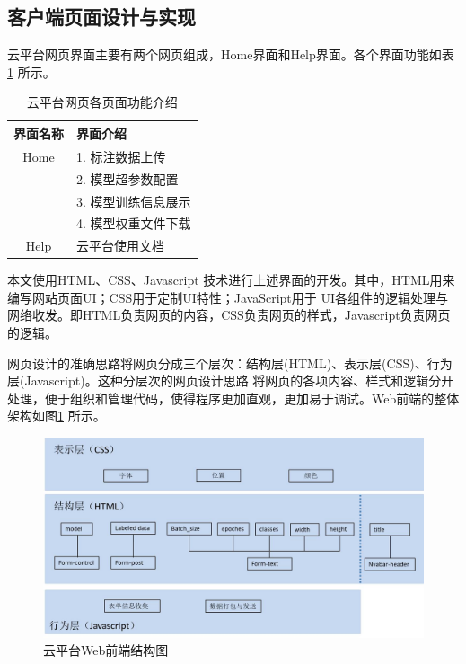 \subsection{客户端页面设计与实现}

云平台网页界面主要有两个网页组成，Home界面和Help界面。各个界面功能如表 \ref{table:Web:features} 所示。

{
    \begin{table}[htb] 
        \caption{云平台网页各页面功能介绍}
        \label{table:Web:features}
        \centering
        \begin{tabular}[t]{c|l}
            \hline
            界面名称 & 界面介绍   \\
            \hline
            Home & 1. 标注数据上传 \\
             & 2. 模型超参数配置 \\
             & 3. 模型训练信息展示 \\
             & 4. 模型权重文件下载 \\
            \hline
            Help & 云平台使用文档 \\
            \hline
        \end{tabular}
    \end{table}
}

本文使用HTML、CSS、Javascript \cite{JS} 技术进行上述界面的开发。其中，HTML用来编写网站页面UI；CSS用于定制UI特性；JavaScript用于
UI各组件的逻辑处理与网络收发。即HTML负责网页的内容，CSS负责网页的样式，Javascript负责网页的逻辑。

网页设计的准确思路将网页分成三个层次：结构层(HTML)、表示层(CSS)、行为层(Javascript)。这种分层次的网页设计思路
将网页的各项内容、样式和逻辑分开处理，便于组织和管理代码，使得程序更加直观，更加易于调试。Web前端的整体架构如图\ref{fig:web_construct}
所示。

\begin{figure}[h]
    \centering
    \includegraphics[width=\textwidth]{pic/chap4/web_construce.jpg}
    \caption{云平台Web前端结构图}
    \label{fig:web_construct}
\end{figure}

